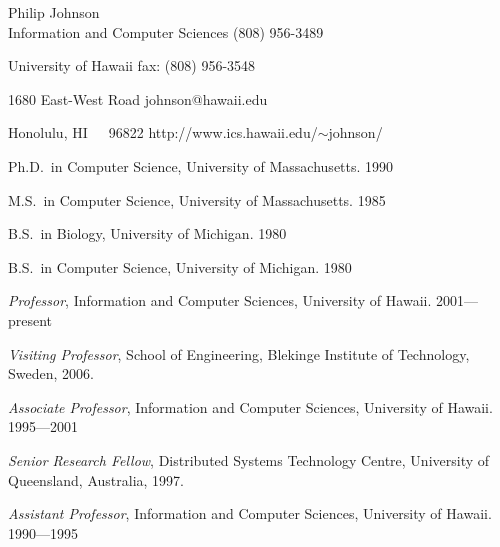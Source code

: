 
\begin{center}
Philip Johnson \\
Information and Computer Sciences \hfill (808) 956-3489

University of Hawaii              \hfill fax: (808) 956-3548

1680 East-West Road               \hfill johnson@hawaii.edu

Honolulu, HI~~~96822              \hfill http://www.ics.hawaii.edu/$\sim$johnson/

\end{center}

\begin{Professional Preparation}
\item Ph.D.~in Computer Science, University of Massachusetts. 1990 
\item M.S.~in Computer Science, University of Massachusetts.  1985
\item B.S.~in Biology, University of Michigan. 1980
\item B.S.~in Computer Science, University of Michigan. 1980
\end{Professional Preparation}

\begin{Appointments}
\item {\em Professor},  Information and Computer Sciences, University of Hawaii.  2001---present
\item {\em Visiting Professor}, School of Engineering, Blekinge Institute of Technology, Sweden, 2006.
\item {\em Associate Professor},  Information and Computer Sciences, University of Hawaii.  1995---2001
\item {\em Senior Research Fellow},  Distributed Systems Technology Centre, University of Queensland, Australia, 1997.
\item {\em Assistant Professor},   Information and Computer Sciences, University of Hawaii.  1990---1995
\end{Appointments}


